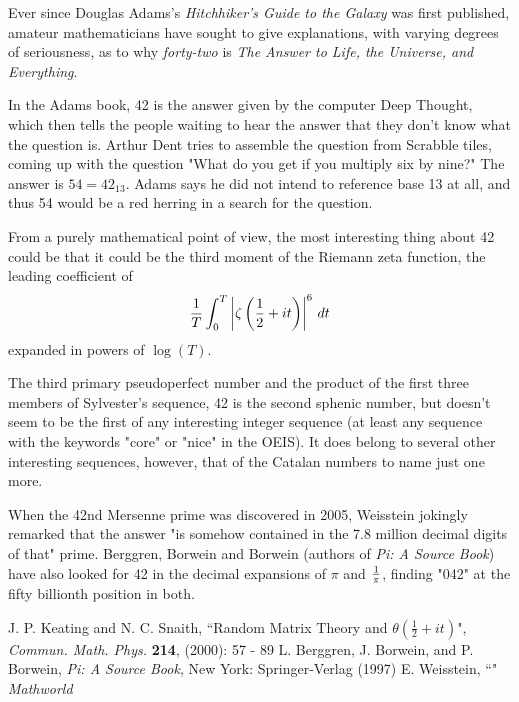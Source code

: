 \documentclass[12pt]{article}
\begin{document}

Ever since Douglas Adams's {\it Hitchhiker's Guide to the Galaxy} was first published, amateur mathematicians have sought to give explanations, with varying degrees of seriousness, as to why {\em forty-two} is {\em The Answer to Life, the Universe, and Everything}.

In the Adams book, 42 is the answer given by the computer Deep Thought, which then tells the people waiting to hear the answer that they don't know what the question is. Arthur Dent tries to assemble the question from Scrabble tiles, coming up with the question "What do you get if you multiply six by nine?" The answer is $54 = 42_{13}$. Adams says he did not intend to reference base 13 at all, and thus 54 would be a red herring in a search for the question.

From a purely mathematical point of view, the most interesting thing about 42 could be that it could be the third moment of the Riemann zeta function, the leading coefficient of $${1 \over T}\int_0^T \left| \zeta\left({1 \over 2} + it\right) \right|^6\,dt$$ expanded in powers of $\log(T)$.

The third primary pseudoperfect number and the product of the first three members of Sylvester's sequence, 42 is the second sphenic number, but doesn't seem to be the first of any interesting integer sequence (at least any sequence with the keywords "core" or "nice" in the OEIS). It does belong to several other interesting sequences, however, that of the Catalan numbers to name just one more.

When the 42nd Mersenne prime was discovered in 2005, Weisstein jokingly remarked that the answer "is somehow contained in the 7.8 million decimal digits of that" prime. Berggren, Borwein and Borwein (authors of {\it Pi: A Source Book}) have also looked for 42 in the decimal expansions of $\pi$ and ${1 \over \pi}$, finding "042" at the fifty billionth position in both.

\begin{thebibliography}{3}
 J. P. Keating and N. C. Snaith, ``Random Matrix Theory and $\theta(\frac{1}{2} + it)$", {\it Commun. Math. Phys.} {\bf 214}, (2000): 57 - 89
 L. Berggren, J. Borwein, and P. Borwein, {\it Pi: A Source Book}, New York: Springer-Verlag (1997)
 E. Weisstein, ``" {\it Mathworld}
\end{thebibliography}
\end{document}
